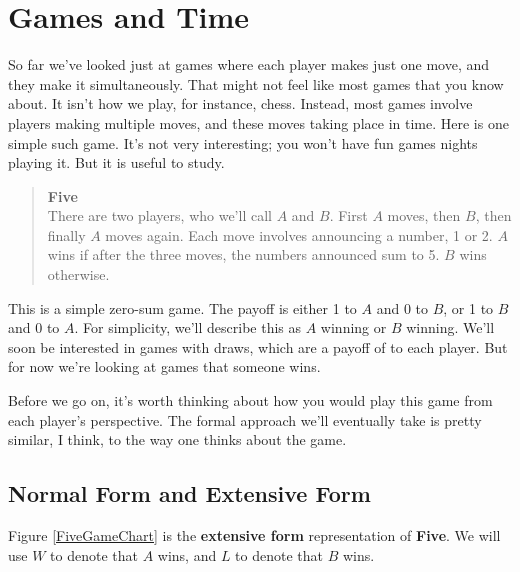\documentclass[openany]{book}
\begin{document}
\chapter{Games and Time}

So far we've looked just at games where each player makes just one move, and they make it simultaneously. That might not feel like most games that you know about. It isn't how we play, for instance, chess. Instead, most games involve players making multiple moves, and these moves taking place in time. Here is one simple such game. It's not very interesting; you won't have fun games nights playing it. But it is useful to study.

\begin{quote}
\textbf{Five} \\
There are two players, who we'll call $A$ and $B$. First $A$ moves, then $B$, then finally $A$ moves again. Each move involves announcing a number, 1 or 2. $A$ wins if after the three moves, the numbers announced sum to 5. $B$ wins otherwise. 
\end{quote}
This is a simple zero-sum game. The payoff is either 1 to $A$ and 0 to $B$, or 1 to $B$ and 0 to $A$. For simplicity, we'll describe this as $A$ winning or $B$ winning. We'll soon be interested in games with draws, which are a payoff of  to each player. But for now we're looking at games that someone wins. 

Before we go on, it's worth thinking about how you would play this game from each player's perspective. The formal approach we'll eventually take is pretty similar, I think, to the way one thinks about the game.

\section{Normal Form and Extensive Form}

Figure \ref{FiveGameChart} is the \textbf{extensive form} representation of \textbf{Five}. We will use $W$ to denote that $A$ wins, and $L$ to denote that $B$ wins. 
\end{document}
